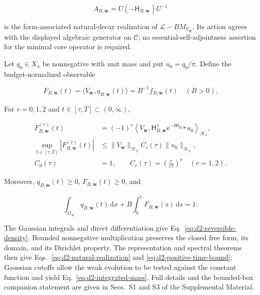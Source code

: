 \documentclass[aps,physrev,reprint,amsmath,amssymb,longbibliography,floatfix]{revtex4-2}
\newcommand{\dd}{\mathrm d}
\newcommand{\e}{\mathrm e}
\begin{document}
\begin{equation}
 A_{B,\bm w}=U(-\mathsf H_{B,\bm w})U^{-1}
 \label{eq:d2-natural-realization}
\end{equation}

is the form-associated natural-decay realization of
$\mathcal L-BM_{V_{\bm w}}$.  Its action agrees with the displayed algebraic
generator on $\mathcal C$; no essential-self-adjointness assertion for the
minimal core operator is required.

Let $q_0\in X_\pi$ be nonnegative with unit mass and put $u_0=q_0/\pi$.  Define
the budget-normalized observable

\begin{equation}
 F_{B,\bm w}(t)
 =\langle V_{\bm w},q_{B,\bm w}(t)\rangle
 =B^{-1}f_{B,\bm w}(t)\quad(B>0).
 \label{eq:d2-normalized-observable}
\end{equation}

For $r=0,1,2$ and $t\in[\tau,T]\subset(0,\infty)$,

\begin{align}
 F_{B,\bm w}^{(r)}(t)
 &=(-1)^r\left\langle V_{\bm w},
   \mathsf H_{B,\bm w}^{\,r}
   \e^{-t\mathsf H_{B,\bm w}}u_0\right\rangle_{\mathcal H_\pi},
 \nonumber\\
 \sup_{t\in[\tau,T]}|F_{B,\bm w}^{(r)}(t)|
 &\le
 \|V_{\bm w}\|_{\mathcal H_\pi}C_r(\tau)
 \|u_0\|_{\mathcal H_\pi},
 \label{eq:d2-positive-time-bound}\\
 C_0(\tau)&=1,\qquad
 C_r(\tau)=\left(\frac{r}{e\tau}\right)^r\quad(r=1,2).
 \nonumber
\end{align}

Moreover, $q_{B,\bm w}(t)\ge0$, $F_{B,\bm w}(t)\ge0$, and

\begin{equation}
 \int_{\Omega_\infty}q_{B,\bm w}(t)\,\dd x
 +B\int_0^tF_{B,\bm w}(s)\,\dd s=1 .
 \label{eq:d2-integrated-mass}
\end{equation}

The Gaussian integrals and direct differentiation give
Eq.~\eqref{eq:d2-reversible-density}.  Bounded nonnegative multiplication
preserves the closed free form, its domain, and its Dirichlet property.  The
representation and spectral theorems then give
Eqs.~\eqref{eq:d2-natural-realization} and
\eqref{eq:d2-positive-time-bound}; Gaussian cutoffs allow the weak evolution to
be tested against the constant function and yield
Eq.~\eqref{eq:d2-integrated-mass}.  Full details and the bounded-box companion
statement are given in Secs.~S1 and S3 of the Supplemental Material.
\end{document}
